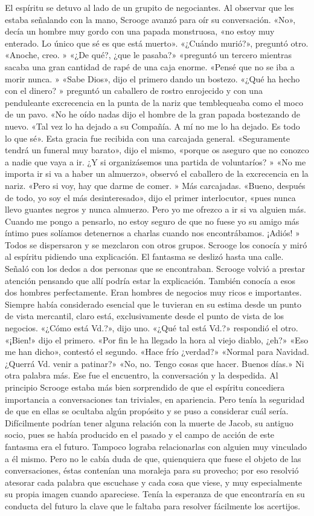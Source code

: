 \documentclass{novela}
\begin{document}
 El espíritu se detuvo al lado de un grupito de negociantes. Al observar que les estaba señalando con la mano, Scrooge avanzó para oír su conversación.
 «No», decía un hombre muy gordo con una papada monstruosa, «no estoy muy enterado. Lo único que sé es que está muerto».
 «¿Cuándo murió?», preguntó otro.
 «Anoche, creo. »
 «¿De qué?, ¿que le pasaba?» «preguntó un tercero mientras sacaba una gran cantidad de rapé de una caja enorme. «Pensé que no se iba a morir nunca. »
 «Sabe Dios», dijo el primero dando un bostezo.
 «¿Qué ha hecho con el dinero? » preguntó un caballero de rostro enrojecido y con una penduleante excrecencia en la punta de la nariz que temblequeaba como el moco de un pavo.
 «No he oído nadas dijo el hombre de la gran papada bostezando de nuevo. «Tal vez lo ha dejado a su Compañía. A mí no me lo ha dejado. Es todo lo que sé».
 Esta gracia fue recibida con una carcajada general.
 «Seguramente tendrá un funeral muy barato», dijo el mismo, «porque os aseguro que no conozco a nadie que vaya a ir. ¿Y si organizásemos una partida de voluntaríos? »
 «No me importa ir si va a haber un almuerzo», observó el caballero de la excrecencia en la nariz. «Pero si voy, hay que darme de comer. »
 Más carcajadas.
 «Bueno, después de todo, yo soy el más desinteresado», dijo el primer interlocutor, «pues nunca llevo guantes negros y nunca almuerzo. Pero yo me ofrezco a ir si va alguien más. Cuando me pongo a pensarlo, no estoy seguro de que no fuese yo su amigo más íntimo pues solíamos detenernos a charlas cuando nos encontrábamos. ¡Adiós! »
 Todos se dispersaron y se mezclaron con otros grupos. Scrooge los conocía y miró al espíritu pidiendo una explicación.
 El fantasma se deslizó hasta una calle. Señaló con los dedos a dos personas que se encontraban. Scrooge volvió a prestar atención pensando que allí podría estar la explicación.
 También conocía a esos dos hombres perfectamente. Eran hombres de negocios muy ricos e importantes. Siempre había considerado esencial que le tuvieran en su estima desde un punto de vista mercantil, claro está, exclusivamente desde el punto de vista de los negocios.
 «¿Cómo está Vd.?», dijo uno.
 «¿Qué tal está Vd.?» respondió el otro.
 «¡Bien!» dijo el primero. «Por fin le ha llegado la hora al viejo diablo, ¿eh?»
 «Eso me han dicho», contestó el segundo. «Hace frío ¿verdad?»
 «Normal para Navidad. ¿Querrá Vd. venir a patinar?»
 «No, no. Tengo cosas que hacer. Buenos días.»
 Ni otra palabra más. Ese fue el encuentro, la conversación y la despedida.
 Al principio Scrooge estaba más bien sorprendido de que el espíritu concediera importancia a conversaciones tan triviales, en apariencia. Pero tenía la seguridad de que en ellas se ocultaba algún propósito y se puso a considerar cuál sería. Difícilmente podrían tener alguna relación con la muerte de Jacob, su antiguo socio, pues se había producido en el pasado y el campo de acción de este fantasma era el futuro. Tampoco lograba relacionarlas con alguien muy vinculado a él mismo. Pero no le cabía duda de que, quienquiera que fuese el objeto de las conversaciones, éstas contenían una moraleja para su provecho; por eso resolvió atesorar cada palabra que escuchase y cada cosa que viese, y muy especialmente su propia imagen cuando apareciese. Tenía la esperanza de que encontraría en su conducta del futuro la clave que le faltaba para resolver fácilmente los acertijos.
\end{document}
